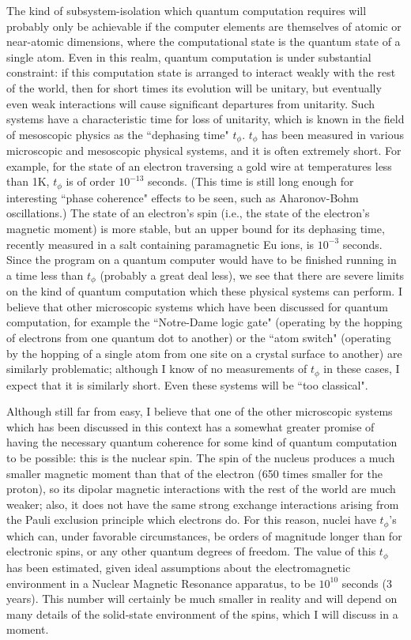 The kind of subsystem-isolation which quantum computation requires will
probably
only be achievable if the computer elements are themselves of atomic or
near-atomic dimensions, where the computational state is the quantum state
of a single atom.  Even in this realm, quantum computation is under substantial
constraint: if this computation state is arranged to interact weakly with the
rest of the world, then for short times its evolution will be unitary, but
eventually even weak interactions will cause significant departures
from unitarity.
Such systems have a characteristic time for loss of unitarity, which is
known in the field of mesoscopic physics as the ``dephasing time"
$t_\phi$\cite{Wash}.
$t_\phi$ has been measured in various microscopic and mesoscopic physical
systems, and it is often extremely short.  For example, for the state of an
electron traversing a gold wire at temperatures less than 1K,
$t_\phi$ is of order $10^{-13}$ seconds.  (This time is still long enough
for interesting ``phase coherence" effects to be seen, such as Aharonov-Bohm
oscillations\cite{Wash}.)
The state of an electron's spin\cite{Band}
(i.e., the state of the
electron's magnetic moment) is more stable, but an upper bound for its
dephasing time, recently measured in a salt containing
paramagnetic Eu ions\cite{Eu}, is $10^{-3}$ seconds.
Since the program on a quantum computer would have to be finished running
in a time less than $t_\phi$ (probably a great deal less), we see that there
are severe limits on the kind of quantum computation which these physical
systems can perform.
I believe that other microscopic systems which have been discussed for
quantum computation, for example the ``Notre-Dame logic gate"\cite{Poro}
(operating
by the hopping of electrons from one quantum dot to another) or the ``atom
switch"\cite{Eig}
(operating by the hopping of a single atom from one site on a crystal
surface to another) are similarly problematic;
although I know of no measurements of $t_\phi$ in
these cases, I expect that it is similarly short.
Even these systems will be ``too classical"\cite{foot1}.

Although still far from easy, I believe that one of the other microscopic
systems which has been discussed in this context has a somewhat greater
promise of having the necessary quantum coherence for some kind of quantum
computation to be possible:  this is the nuclear spin.  The spin of the
nucleus produces a much smaller magnetic moment than that of the electron
(650
times smaller for the proton), so its dipolar magnetic interactions with the
rest of the world are much weaker; also, it does not have the same strong
exchange
interactions arising from the Pauli exclusion principle which electrons do.
For this reason, nuclei have $t_\phi$'s which
can, under favorable circumstances, be orders of magnitude longer than for
electronic spins, or any other quantum degrees of freedom.  The value of
this $t_\phi$ has been estimated, given ideal assumptions about the
electromagnetic environment in a Nuclear Magnetic Resonance apparatus,
to be $10^{10}$ seconds
(3 years)\cite{Abr,Lloyd2}.  This number will certainly be much smaller
in reality and will
depend on many details of the solid-state environment of the spins,
which I will discuss in a moment.

